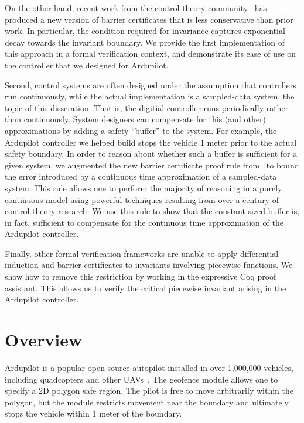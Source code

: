 On the other hand, recent work from the control theory
community~\cite{kong2013barrier,xu15barrier,nguyen16barrier} has produced a
new version of barrier certificates that is less conservative than prior
work. In particular, the condition required for invariance captures
exponential decay towards the invariant boundary. We provide the first
implementation of this approach in a formal verification context, and
demonstrate its ease of use on the controller that we designed for
Ardupilot.

Second, control systems are often designed under the assumption that
controllers run continuously, while the actual implementation is a
sampled-data system, the topic of this disseration. That is, the digitial
controller runs periodically rather than continuously. System designers can
compensate for this (and other) approximations by adding a safety
``buffer'' to the system. For example, the Ardupilot controller we helped
build stops the vehicle 1 meter prior to the actual safety boundary. In
order to reason about whether such a buffer is sufficient for a given
system, we augmented the new barrier certificate proof rule
from~\cite{kong2013barrier,xu15barrier,nguyen16barrier} to bound the error
introduced by a continuous time approximation of a sampled-data
system. This rule allows one to perform the majority of reasoning in a
purely continuous model using powerful techniques resulting from over a
century of control theory research. We use this rule to show that the
constant sized buffer is, in fact, sufficient to compensate for the
continuous time approximation of the Ardupilot controller.

Finally, other formal verification frameworks are unable to apply
differential induction and barrier certificates to invariants involving
piecewise functions.  We show how to remove this restriction by working in
the expressive Coq proof assistant. This allows us to verify the critical
piecewise invariant arising in the Ardupilot controller.

\section{Overview}
\label{sec:exp-smpl-overview}
Ardupilot is a popular open source autopilot installed in over 1,000,000
vehicles, including quadcopters and other UAVs~\cite{ardupilot}. The
geofence module allows one to specify a 2D polygon safe region. The pilot
is free to move arbitrarily within the polygon, but the module restricts
movement near the boundary and ultimately stops the vehicle within 1 meter
of the boundary.

